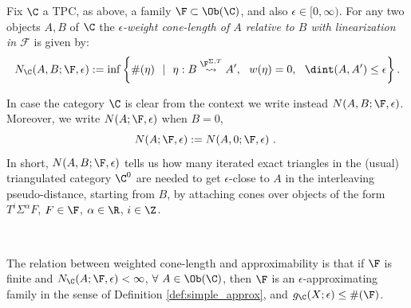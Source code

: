 \begin{dfn}\label{def:w-cl}
  Fix $\C$ a TPC, as above, a family $\F\subset \Ob(\C)$, and also
  $\epsilon\in [0,\infty)$.  For any two objects $A, B$ of $\C$ the
  {\em $\epsilon$-weight cone-length of $A$ relative to $B$ with
    linearization in $\mathcal{F}$} is given by:
  \begin{equation}\label{eq:Number}
    N_{\C}(A, B;\F, \epsilon):=\inf\left\{  \#(\eta)\ \  | \ \ \eta: B\stackrel{\F^{\Sigma, T}}{\rightsquigarrow} A',  \  \ w(\eta)=0, \ \ \dint (A, A')\leq \epsilon \right\}.
  \end{equation}
\end{dfn}
In case the category $\C$ is clear from the context we write instead
$N(A,B;\F,\epsilon)$. Moreover, we write $N(A;\F,\epsilon)$ when
$B=0$, $$N(A;\F,\epsilon) := N(A, 0;\F,\epsilon)~.~$$ In short,
$N(A,B;\F,\epsilon)$ tells us how many iterated exact triangles in
the (usual) triangulated category $\C^{0}$ are needed to get
$\epsilon$-close to $A$ in the interleaving pseudo-distance,
starting from $B$, by attaching cones over objects of the form
$T^{i}\Sigma^{\alpha}F$, $F\in \F$, $\alpha\in\R$, $i\in \Z$.
 
\
 
The relation between weighted cone-length and approximability is that
if $\F$ is finite and $N_{\C}(A;\F,\epsilon) < \infty$,
$\forall \ A\in\Ob(\C)$, then $\F$ is an $\epsilon$-approximating
family in the sense of Definition \ref{def:simple_approx}, and
$g_{\C}(X;\epsilon) \leq \# (\F)$.
 
